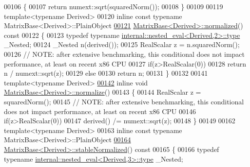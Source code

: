 \begin{DoxyCode}
00106 \textcolor{keyword}{}\{
00107   \textcolor{keywordflow}{return} numext::sqrt(squaredNorm());
00108 \}
00109 
00119 \textcolor{keyword}{template}<\textcolor{keyword}{typename} Derived>
00120 \textcolor{keyword}{inline} \textcolor{keyword}{const} \textcolor{keyword}{typename} MatrixBase<Derived>::PlainObject
\hyperlink{group___core___module_a5cf2fd4c57e59604fd4116158fd34308}{00121} \hyperlink{group___core___module_a5cf2fd4c57e59604fd4116158fd34308}{MatrixBase<Derived>::normalized}()\textcolor{keyword}{ const}
00122 \textcolor{keyword}{}\{
00123   \textcolor{keyword}{typedef} \textcolor{keyword}{typename} \hyperlink{class_eigen_1_1internal_1_1_tensor_lazy_evaluator_writable}{internal::nested\_eval<Derived,2>::type} \_Nested;
00124   \_Nested n(derived());
00125   RealScalar z = n.squaredNorm();
00126   \textcolor{comment}{// NOTE: after extensive benchmarking, this conditional does not impact performance, at least on recent
       x86 CPU}
00127   \textcolor{keywordflow}{if}(z>RealScalar(0))
00128     \textcolor{keywordflow}{return} n / numext::sqrt(z);
00129   \textcolor{keywordflow}{else}
00130     \textcolor{keywordflow}{return} n;
00131 \}
00132 
00141 \textcolor{keyword}{template}<\textcolor{keyword}{typename} Derived>
\hyperlink{group___core___module_ad16303c47ba36f7a41ea264cb26bceb6}{00142} \textcolor{keyword}{inline} \textcolor{keywordtype}{void} \hyperlink{group___core___module_ad16303c47ba36f7a41ea264cb26bceb6}{MatrixBase<Derived>::normalize}()
00143 \{
00144   RealScalar z = squaredNorm();
00145   \textcolor{comment}{// NOTE: after extensive benchmarking, this conditional does not impact performance, at least on recent
       x86 CPU}
00146   \textcolor{keywordflow}{if}(z>RealScalar(0))
00147     derived() /= numext::sqrt(z);
00148 \}
00149 
00162 \textcolor{keyword}{template}<\textcolor{keyword}{typename} Derived>
00163 \textcolor{keyword}{inline} \textcolor{keyword}{const} \textcolor{keyword}{typename} MatrixBase<Derived>::PlainObject
\hyperlink{group___core___module_a399dca938633b9f8df5ec4beefeccec0}{00164} \hyperlink{group___core___module_a399dca938633b9f8df5ec4beefeccec0}{MatrixBase<Derived>::stableNormalized}()\textcolor{keyword}{ const}
00165 \textcolor{keyword}{}\{
00166   \textcolor{keyword}{typedef} \textcolor{keyword}{typename} \hyperlink{class_eigen_1_1internal_1_1_tensor_lazy_evaluator_writable}{internal::nested\_eval<Derived,3>::type} \_Nested;

\end{DoxyCode}
